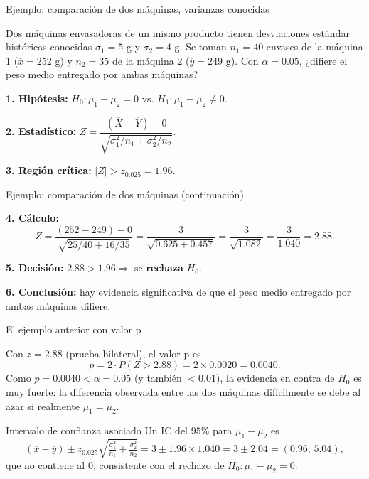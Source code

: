 \documentclass[aspectratio=169,11pt]{beamer}
\begin{document}
\begin{frame}{Ejemplo: comparación de dos máquinas, varianzas conocidas}
\begin{example}
Dos máquinas envasadoras de un mismo producto tienen desviaciones estándar históricas conocidas $\sigma_1=5$ g y $\sigma_2=4$ g. Se toman $n_1=40$ envases de la máquina 1 ($\overline{x}=252$ g) y $n_2=35$ de la máquina 2 ($\overline{y}=249$ g). Con $\alpha=0.05$, ¿difiere el peso medio entregado por ambas máquinas?

\textbf{1. Hipótesis:} $H_0:\mu_1-\mu_2=0$ vs. $H_1:\mu_1-\mu_2\neq0$.

\textbf{2. Estadístico:} $Z=\dfrac{(\overline{X}-\overline{Y})-0}{\sqrt{\sigma_1^2/n_1+\sigma_2^2/n_2}}$.

\textbf{3. Región crítica:} $|Z|>z_{0.025}=1.96$.

\end{example}
\end{frame}

\begin{frame}{Ejemplo: comparación de dos máquinas (continuación)}
\begin{example}
\textbf{4. Cálculo:}
\[
Z=\frac{(252-249)-0}{\sqrt{25/40+16/35}}=\frac{3}{\sqrt{0.625+0.457}}=\frac{3}{\sqrt{1.082}}=\frac{3}{1.040}=2.88.
\]

\textbf{5. Decisión:} $2.88>1.96 \Rightarrow$ se \textbf{rechaza} $H_0$.

\textbf{6. Conclusión:} hay evidencia significativa de que el peso medio entregado por ambas máquinas difiere.
\end{example}
\end{frame}

\begin{frame}{El ejemplo anterior con valor p}
\begin{example}
Con $z=2.88$ (prueba bilateral), el valor p es
\[
p=2\cdot P(Z>2.88)=2\times0.0020=0.0040.
\]
Como $p=0.0040<\alpha=0.05$ (y también $<0.01$), la evidencia en contra de $H_0$ es muy fuerte: la diferencia observada entre las dos máquinas difícilmente se debe al azar si realmente $\mu_1=\mu_2$.
\end{example}

\begin{block}{Intervalo de confianza asociado}
Un IC del $95\%$ para $\mu_1-\mu_2$ es
\[
(\overline{x}-\overline{y}) \pm z_{0.025}\sqrt{\tfrac{\sigma_1^2}{n_1}+\tfrac{\sigma_2^2}{n_2}} = 3 \pm 1.96\times1.040 = 3\pm2.04 = (0.96;\,5.04),
\]
que no contiene al $0$, consistente con el rechazo de $H_0:\mu_1-\mu_2=0$.
\end{block}
\end{frame}
\end{document}
